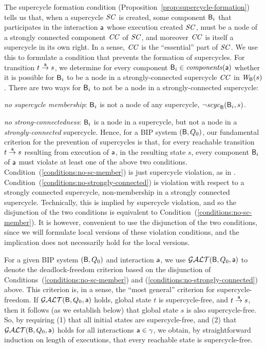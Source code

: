 
The supercycle formation condition (Proposition~\ref{prop:supercycle-formation}) tells us that, when a supercycle $\SC$ is created, some component
$\B_i$ that participates in the interaction $\act$ whose execution created $\SC$, must be a node of a strongly connected component $\CC$ of $\SC$, and
moreover $\CC$ is itself a supercycle in its own right. In a sense, $\CC$ is the ``essential'' part of $\SC$.  We use this to formulate a condition
that prevents the formation of supercycles. For transition $t \goesto[\act] s$, we determine for every component $\B_i \in \cmps{\act}$ whether it is
possible for $\B_i$ to be a node in a strongly-connected supercycle $\CC$ in $\wfg{\B}{s}$.  There are two ways for $\B_i$ to not be a node in a
strongly-connected supercycle: 
%
\bn
\item \label{conditions:no-sc-member}   \textit{no supercycle membership}: $\B_i$ is not a node of any supercycle, \ie $\neg \scyc{\B}{s}{\B_i}$.
\item  \label{conditions:no-strongly-connected} \textit{no strong-connectedness}: $\B_i$ is a node in a supercycle, but not a node in a \emph{strongly-connected} supercycle. 
\en
%
Hence, for a BIP system $(\B, Q_0)$, our fundamental criterion for the prevention of supercycles is that, for every reachable transition
$t \goesto[\act] s$ resulting from execution of $\act$, in the resulting state $s$, every component $\B_i$ of $\act$ must violate at least one of the
above two conditions.  Condition~(\ref{conditions:no-sc-member}) is just supercycle violation, as in .
Condition~(\ref{conditions:no-strongly-connected}) is violation with respect to a strongly connected supercycle, \ie non-membership in a strongly
connected supercycle. Technically, this is implied by supercycle violation, and so the disjunction of the two conditions is equivalent to 
Condition~(\ref{conditions:no-sc-member}). It is however, convenient to use the disjunction of the two conditions, since
we will formulate local versions of these violation conditions, and the implication does not necessarily hold for the local versions.

For a given BIP system $(\B, Q_0)$ and interaction $\act$, we use $\GAO(\B, Q_0, \act)$ to denote the deadlock-freedom criterion based on the
disjunction of Conditions~(\ref{conditions:no-sc-member}) and (\ref{conditions:no-strongly-connected}) above. 
This criterion is, in a sense, the ``most general'' criterion for supercycle-freedom.
%
If $\GAO(\B, Q_0, \act)$ holds, global state $t$ is supercycle-free, and $t \goesto[\act] s$, then it follows (as we establish below) that global
state $s$ is also supercycle-free.  So, by requiring (1) that all initial states are supercycle-free, and (2) that $\GAO(\B, Q_0, \act)$ holds for all
interactions $\act \in \gamma$, we obtain, by straightforward induction on length of executions, that every reachable state is supercycle-free.

